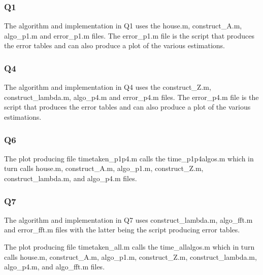 \documentclass{article}
\begin{document}
\subsubsection{Q1}
The algorithm and implementation in Q1 uses the house.m, construct\_A.m, algo\_p1.m and error\_p1.m files. The error\_p1.m file is the script that produces the error tables and can also produce a plot of the various estimations.

\subsubsection{Q4}
The algorithm and implementation in Q4 uses the construct\_Z.m, construct\_lambda.m, algo\_p4.m and error\_p4.m files. The error\_p4.m file is the script that produces the error tables and can also produce a plot of the various estimations.

\subsubsection{Q6}
The plot producing file timetaken\_p1p4.m calls the time\_p1p4algos.m which in turn calls house.m, construct\_A.m, algo\_p1.m, construct\_Z.m, construct\_lambda.m, and algo\_p4.m files.

\subsubsection{Q7}
The algorithm and implementation in Q7 uses construct\_lambda.m, algo\_fft.m and error\_fft.m files with the latter being the script producing error tables.

The plot producing file timetaken\_all.m calls the time\_allalgos.m which in turn calls house.m, construct\_A.m, algo\_p1.m, construct\_Z.m, construct\_lambda.m, algo\_p4.m, and algo\_fft.m files.
\end{document}
